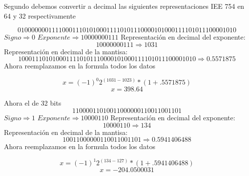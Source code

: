 \documentclass[12pt]{article}
\begin{document}
Segundo debemos convertir a decimal las siguientes representaciones IEE 754 en 64 y 32 respectivamente

$$0 10000000111 1000111010100011110101110000101000111101011100001010$$
$Signo \Rightarrow 0$
\newline$Exponente \Rightarrow 10000000111$ 
\newline Representación en decimal del exponente:
$$10000000111 \Rightarrow 1031$$
Representación en decimal de la mantisa:
$$1000 1110 1010 0011 1101 0111 0000 1010 0011 1101 0111 0000 1010 \Rightarrow 0.5571875$$
Ahora reemplazamos en la formula todos los datos

$$x = (-1)^0 2^(1031-1023)*(1+.5571875)$$
$$x = 398.64$$

Ahora el de 32 bits
$$1 10000110 10011000000110011001101$$
$Signo \Rightarrow 1$
\newline$Exponente \Rightarrow 10000110$ 
\newline Representación en decimal del exponente:
$$10000110 \Rightarrow 134$$
Representación en decimal de la mantisa:
$$1001 1000 0001 1001 1001 101 \Rightarrow 0.5941406488$$
Ahora reemplazamos en la formula todos los datos

$$x = (-1)^1 2^(134-127)*(1+.5941406488)$$
$$x = -204.0500031$$







\vspace{0.5cm}
\renewcommand{\refname}{\MakeUppercase{REFERENCIAS}}
%
%
\end{document}
